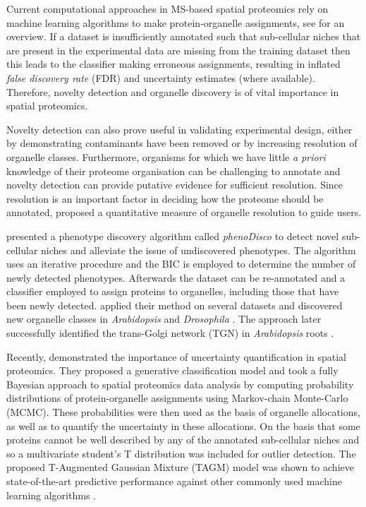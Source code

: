 \documentclass[12pt,english]{article}
\begin{document}
Current computational approaches in MS-based spatial proteomics rely on machine learning algorithms to make protein-organelle assignments, see \citep{Gatto:2014b} for an overview. If a dataset is insufficiently annotated such that sub-cellular niches that are present in the experimental data are missing from the training dataset then this leads to the classifier making erroneous assignments, resulting in inflated \textit{false discovery rate} (FDR) and uncertainty estimates (where available). Therefore, novelty detection and organelle discovery is of vital importance in spatial proteomics.

Novelty detection can also prove useful in validating experimental design, either by demonstrating contaminants have been removed or by increasing resolution of organelle classes. Furthermore, organisms for which we have little \textit{a priori} knowledge of their proteome organisation can be challenging to annotate and novelty detection can provide putative evidence for sufficient resolution. Since resolution is an important factor in deciding how the proteome should be annotated, \cite{Gatto:2018} proposed a quantitative measure of organelle resolution to guide users.

\cite{Breckels:2013} presented a phenotype discovery algorithm called \textit{phenoDisco} to detect novel sub-cellular niches and alleviate the issue of undiscovered phenotypes. The algorithm uses an iterative procedure and the BIC \citep{Schwarz::1978} is employed to determine the number of newly detected phenotypes. Afterwards the dataset can be re-annotated and a classifier employed to assign proteins to organelles, including those that have been newly detected. \cite{Breckels:2013} applied their method on several datasets and discovered new organelle classes in \textit{Arabidopsis} \citep{Dunkley:2006} and \textit{Drosophila} \citep{Tan:2009}. The approach later successfully identified the trans-Golgi network (TGN) in \textit{Arabidopsis} roots \citep{Groen:2014}.

Recently, \cite{Crook:2018} demonstrated the importance of uncertainty quantification in spatial proteomics. They proposed a generative classification model and took a fully Bayesian approach to spatial proteomics data analysis by computing probability distributions of protein-organelle assignments using Markov-chain Monte-Carlo (MCMC). These probabilities were then used as the basis of organelle allocations, as well as to quantify the uncertainty in these allocations. On the basis that some proteins cannot be well described by any of the annotated sub-cellular niches and so a multivariate student's T distribution was included for outlier detection. The proposed T-Augmented Gaussian Mixture (TAGM) model was shown to achieve state-of-the-art predictive performance against other commonly used machine learning algorithms \citep{Crook:2018}. 
\end{document}
